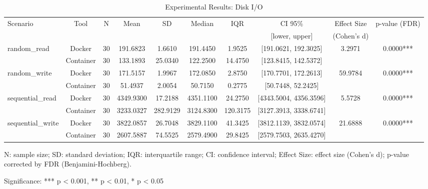 \documentclass{article}
\begin{document}

\begin{table}[h]
\centering
\small
\caption{Experimental Results: Disk I/O}
\label{tab:disk_i_o}
\begin{tabular}{lccccccccc}
\toprule
Scenario & Tool & N & Mean & SD & Median & IQR & CI 95\% & Effect Size & p-value (FDR) \\
 & & & & & & & [lower, upper] & (Cohen's d) & \\
\midrule
\multirow{2}{*}{random\_read} & Docker & 30 & 191.6823 & 1.6610 & 191.4450 & 1.9525 & [191.0621, 192.3025] & 3.2971 & 0.0000*** \\
 & Container & 30 & 133.1893 & 25.0340 & 122.2500 & 14.4750 & [123.8415, 142.5372] &  &  \\
\midrule
\multirow{2}{*}{random\_write} & Docker & 30 & 171.5157 & 1.9967 & 172.0850 & 2.8750 & [170.7701, 172.2613] & 59.9784 & 0.0000*** \\
 & Container & 30 & 51.4937 & 2.0054 & 50.7150 & 0.2775 & [50.7448, 52.2425] &  &  \\
\midrule
\multirow{2}{*}{sequential\_read} & Docker & 30 & 4349.9300 & 17.2188 & 4351.1100 & 24.2750 & [4343.5004, 4356.3596] & 5.5728 & 0.0000*** \\
 & Container & 30 & 3233.0327 & 282.9129 & 3124.8300 & 120.3175 & [3127.3913, 3338.6741] &  &  \\
\midrule
\multirow{2}{*}{sequential\_write} & Docker & 30 & 3822.0857 & 26.7048 & 3829.1100 & 41.3425 & [3812.1139, 3832.0574] & 21.6888 & 0.0000*** \\
 & Container & 30 & 2607.5887 & 74.5525 & 2579.4900 & 29.8425 & [2579.7503, 2635.4270] &  &  \\
\midrule
\bottomrule
\end{tabular}
\begin{tablenotes}
\small
\item N: sample size; SD: standard deviation; IQR: interquartile range; CI: confidence interval; Effect Size: effect size (Cohen's d); p-value corrected by FDR (Benjamini-Hochberg).
\item Significance: *** p < 0.001, ** p < 0.01, * p < 0.05
\end{tablenotes}
\end{table}
\end{document}
